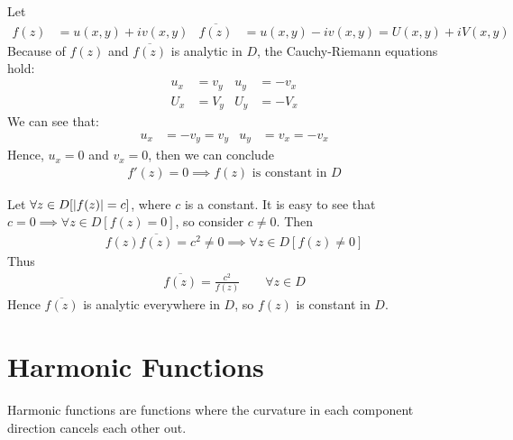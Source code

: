 \documentclass[12pt, english]{book}
\begin{document}
	\begin{example}
		Let 
		\begin{align*}
			f(z) &= u(x,y) + iv(x,y) & \overline{f(z)} &= u(x,y) - iv(x,y) = U(x,y) + iV(x,y)
		\end{align*}
		Because of \(f(z)\) and \(\overline{f(z)}\) is analytic in \(D\), the Cauchy-Riemann equations hold:
		\begin{align*}
			u_x &= v_y		&	u_y &= -v_x \\
			U_x &= V_y		&	U_y &= -V_x
		\end{align*}
		We can see that:
		\begin{align*}
			u_x &= -v_y	= v_y &	u_y &= v_x = -v_x
		\end{align*}
		Hence, \(u_x = 0\) and \(v_x = 0\), then we can conclude
		\begin{align*}
			f'(z) = 0 \implies f(z) \text{ is constant in } D
		\end{align*}
	\end{example}

	\begin{example}
		Let \(\forall z \in D[\abs{f(z)} = c]\), where \(c\) is a constant. It is easy to see that \(c = 0 \implies \forall z \in D[f(z) = 0]\), so consider \(c \neq 0\). Then
		\begin{align*}
			f(z)\overline{f(z)} = c^2 \neq 0 \implies \forall z \in D[f(z) \neq 0]
		\end{align*}
		Thus
		\begin{align*}
			\overline{f(z)} = \frac{c^2}{f(z)} \qquad \forall z \in D
		\end{align*}
		Hence \(\overline{f(z)}\) is analytic everywhere in \(D\), so \(f(z)\) is constant in \(D\).
		\label{Abs of analytic function is constant in domain implies that function is constant Example - Complex}
	\end{example}
	
	\section{Harmonic Functions} \label{Harmonic Functions - Complex}
	
	Harmonic functions are functions where the curvature in each component direction cancels each other out.
	
\end{document}
